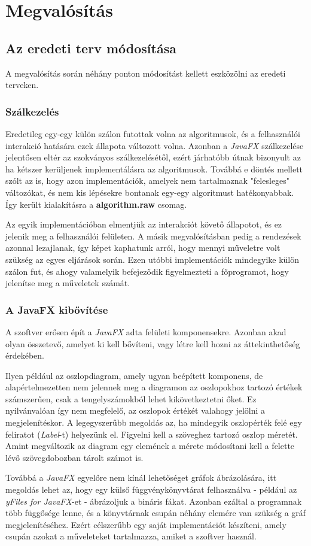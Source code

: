 \documentclass{elteikthesis}
\begin{document}
\section{Megvalósítás}
\subsection{Az eredeti terv módosítása}
A megvalósítás során néhány ponton módosítást kellett eszközölni az eredeti terveken.
\subsubsection{Szálkezelés}
Eredetileg egy-egy külön szálon futottak volna az algoritmusok, és a felhasználói interakció hatására ezek állapota változott volna. Azonban a \emph{JavaFX} szálkezelése jelentősen eltér az szokványos szálkezelésétől, ezért járhatóbb útnak bizonyult az ha kétszer kerüljenek implementálásra az algoritmusok. Továbbá e döntés mellett szólt az is, hogy azon implementációk, amelyek nem tartalmaznak "felesleges" változókat, és nem kis lépésekre bontanak egy-egy algoritmust hatékonyabbak. Így került kialakításra a \textbf{algorithm.raw} csomag.\par
 Az egyik implementációban elmentjük az interakciót követő állapotot, és ez jelenik meg a felhasználói felületen. A másik megvalósításban pedig a rendezések azonnal lezajlanak, így képet kaphatunk arról, hogy mennyi műveletre volt szükség az egyes eljárások során. Ezen utóbbi implementációk mindegyike külön szálon fut, és ahogy valamelyik befejeződik figyelmezteti a főprogramot, hogy jelenítse meg a műveletek számát.
\subsubsection{A JavaFX kibővítése}
A szoftver erősen épít a \emph{JavaFX} adta felületi komponensekre. Azonban akad olyan összetevő, amelyet ki kell bővíteni, vagy létre kell hozni az áttekinthetőség érdekében.\par
Ilyen például az oszlopdiagram, amely ugyan beépített komponens, de alapértelmezetten nem jelennek meg a diagramon az oszlopokhoz tartozó értékek számszerűen, csak a tengelyszámokból lehet kikövetkeztetni őket. Ez nyilvánvalóan így nem megfelelő, az oszlopok értékét valahogy jelölni a megjelenítéskor. A legegyszerűbb megoldás az, ha mindegyik oszlopérték felé egy feliratot (\emph{Label}-t) helyezünk el. Figyelni kell a szöveghez tartozó oszlop méretét. Amint megváltozik az diagram egy elemének a mérete módosítani kell a felette lévő szövegdobozban tárolt számot is.\par
Továbbá a \emph{JavaFX} egyelőre nem kínál lehetőséget gráfok ábrázolására, itt megoldás lehet az, hogy egy külső függvénykönyvtárat felhasználva - például az \emph{yFiles for JavaFX}-et -  ábrázoljuk a bináris fákat. Azonban ezáltal a programnak több függősége lenne, és a könyvtárnak csupán néhány elemére van szükség a gráf megjelenítéséhez. Ezért célszerűbb egy saját implementációt készíteni, amely csupán azokat a műveleteket tartalmazza, amiket a szoftver használ.
\end{document}
